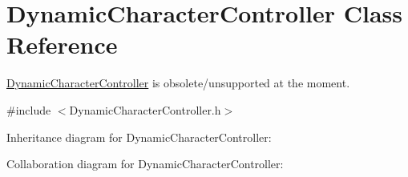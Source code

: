 \hypertarget{class_dynamic_character_controller}{\section{Dynamic\+Character\+Controller Class Reference}
\label{class_dynamic_character_controller}
}


\hyperlink{class_dynamic_character_controller}{Dynamic\+Character\+Controller} is obsolete/unsupported at the moment.  




{\ttfamily \#include $<$Dynamic\+Character\+Controller.\+h$>$}



Inheritance diagram for Dynamic\+Character\+Controller\+:


Collaboration diagram for Dynamic\+Character\+Controller\+:
